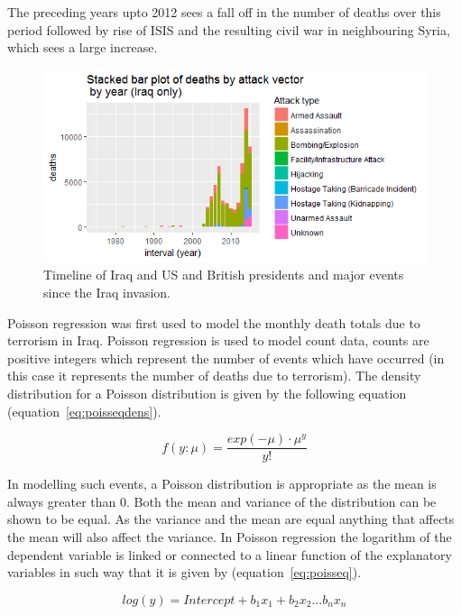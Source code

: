 The preceding years upto 2012 sees a fall off in the number of deaths over this period followed by rise of ISIS \citep{sekulow2015rise} and the resulting civil war in neighbouring Syria, which sees a large increase. 

\begin{figure}[t]
\includegraphics[width=15cm]{Peters_experiment_markdown_files/figure-latex/Rplot01IraqDeaths.png}
\caption{Timeline of Iraq  and US and British presidents and major events since the Iraq invasion.}
\label{fig:deathsiniraq}
\centering
\end{figure}

Poisson regression was first used to model the monthly death totals due to terrorism in Iraq. Poisson regression is used to model count data, counts are positive integers which represent the number of events which have occurred (in this case it represents the number of deaths due to terrorism). The density distribution for a Poisson distribution is given by the following equation (equation~\ref{eq:poisseqdens}).

\begin{equation} f(y:\mu)= \frac{exp(-\mu)\cdot \mu^y}{y!}  \label{eq:poisseqdens}  \end{equation}

In modelling such events, a Poisson distribution is appropriate as the mean is always greater than 0. Both the mean and variance of the distribution can be shown to be equal. As the variance and the mean are equal anything that affects the mean will also affect the variance. In Poisson regression the logarithm of the dependent variable is linked or connected to a linear function of the explanatory variables in such way that it is given by (equation~\ref{eq:poisseq}).

\begin{equation} log(y)=Intercept+b_1x_1+b_2x_2...b_nx_n   \label{eq:poisseq}  \end{equation}

